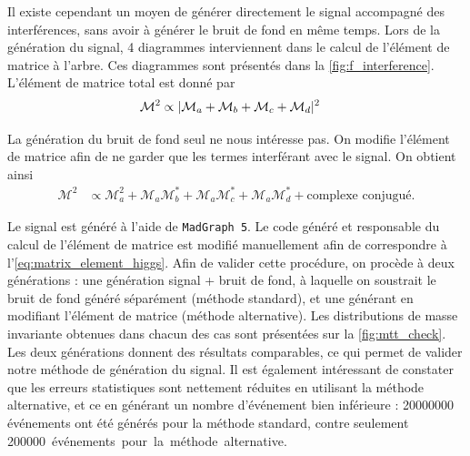 Il existe cependant un moyen de générer directement le signal accompagné des interférences, sans avoir à générer le bruit de fond en même temps. Lors de la génération du signal, 4 diagrammes interviennent dans le calcul de l'élément de matrice à l'arbre. Ces diagrammes sont présentés dans la \cref{fig:f_interference}. L'élément de matrice total est donné par
\begin{align*}
  \mathcal{M}^2 &\propto \lvert \mathcal{M}_a + \mathcal{M}_b + \mathcal{M}_c + \mathcal{M}_d \rvert^2
\end{align*}

La génération du bruit de fond seul ne nous intéresse pas. On modifie l'élément de matrice afin de ne garder que les termes interférant avec le signal. On obtient ainsi
\begin{align} \label{eq:matrix_element_higgs}
  \mathcal{M}^2 &\propto \mathcal{M}_a^2 + \mathcal{M}_a\mathcal{M}_b^\ast + \mathcal{M}_a\mathcal{M}_c^\ast + \mathcal{M}_a\mathcal{M}_d^\ast + \text{complexe conjugué}.
\end{align}

Le signal est généré à l'aide de \texttt{MadGraph 5}. Le code généré et responsable du calcul de l'élément de matrice est modifié manuellement afin de correspondre à l'\cref{eq:matrix_element_higgs}. Afin de valider cette procédure, on procède à deux générations : une génération signal + bruit de fond, à laquelle on soustrait le bruit de fond généré séparément (méthode standard), et une générant en modifiant l'élément de matrice (méthode alternative). Les distributions de masse invariante \mtt obtenues dans chacun des cas sont présentées sur la \cref{fig:mtt_check}. Les deux générations donnent des résultats comparables, ce qui permet de valider notre méthode de génération du signal. Il est également intéressant de constater que les erreurs statistiques sont nettement réduites en utilisant la méthode alternative, et ce en générant un nombre d'événement bien inférieure : \tilde\num{20000000} événements ont été générés pour la méthode standard, contre seulement \tilde\SI{200000} événements pour la méthode alternative.

